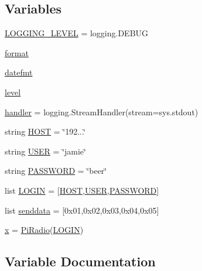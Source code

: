 \subsection*{Variables}
\begin{DoxyCompactItemize}
\item 
\mbox{\hyperlink{namespaceu_ccoms_a9439a087a2f706f59e711b24105a3ef1}{L\+O\+G\+G\+I\+N\+G\+\_\+\+L\+E\+V\+EL}} = logging.\+D\+E\+B\+UG
\item 
\mbox{\hyperlink{namespaceu_ccoms_a1070a9e7db6d33b9ffcd595bdecd97a2}{format}}
\item 
\mbox{\hyperlink{namespaceu_ccoms_abb4f74535c1815c7e1e925c580064768}{datefmt}}
\item 
\mbox{\hyperlink{namespaceu_ccoms_a98aa900adb18322c69550a67c72e2b0d}{level}}
\item 
\mbox{\hyperlink{namespaceu_ccoms_abcdcaa8cce9916174e18e8c89c6ca6aa}{handler}} = logging.\+Stream\+Handler(stream=sys.\+stdout)
\item 
string \mbox{\hyperlink{namespaceu_ccoms_a90271686cb28137e4120a2fe5fff5ff2}{H\+O\+ST}} = \char`\"{}192...\char`\"{}
\item 
string \mbox{\hyperlink{namespaceu_ccoms_a300efdcbe8f88bd91a7d1585d7546eed}{U\+S\+ER}} = \char`\"{}jamie\char`\"{}
\item 
string \mbox{\hyperlink{namespaceu_ccoms_ae6f9b8fdfb8f30368cab1ce40c927f81}{P\+A\+S\+S\+W\+O\+RD}} = \char`\"{}beer\char`\"{}
\item 
list \mbox{\hyperlink{namespaceu_ccoms_ae2aa412a23b414e90847ae138987f3a0}{L\+O\+G\+IN}} = \mbox{[}\mbox{\hyperlink{namespaceu_ccoms_a90271686cb28137e4120a2fe5fff5ff2}{H\+O\+ST}},\mbox{\hyperlink{namespaceu_ccoms_a300efdcbe8f88bd91a7d1585d7546eed}{U\+S\+ER}},\mbox{\hyperlink{namespaceu_ccoms_ae6f9b8fdfb8f30368cab1ce40c927f81}{P\+A\+S\+S\+W\+O\+RD}}\mbox{]}
\item 
list \mbox{\hyperlink{namespaceu_ccoms_a45d75d2afe9d9ddcc718ad8b817756db}{senddata}} = \mbox{[}0x01,0x02,0x03,0x04,0x05\mbox{]}
\item 
\mbox{\hyperlink{namespaceu_ccoms_a60648bb50e391d780fd4d5e546853d19}{x}} = \mbox{\hyperlink{classu_ccoms_1_1_pi_radio}{Pi\+Radio}}(\mbox{\hyperlink{namespaceu_ccoms_ae2aa412a23b414e90847ae138987f3a0}{L\+O\+G\+IN}})
\end{DoxyCompactItemize}


\subsection{Variable Documentation}
\mbox{\label{namespaceu_ccoms_abb4f74535c1815c7e1e925c580064768}} 
